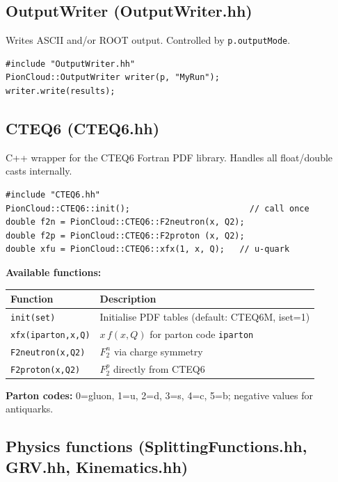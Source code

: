 \documentclass[11pt,a4paper]{article}
\newcommand{\code}[1]{\texttt{#1}}
\begin{document}
\subsection{OutputWriter (OutputWriter.hh)}

Writes ASCII and/or ROOT output.  Controlled by
\code{p.outputMode}.

\begin{lstlisting}[style=cppstyle]
#include "OutputWriter.hh"
PionCloud::OutputWriter writer(p, "MyRun");
writer.write(results);
\end{lstlisting}

\subsection{CTEQ6 (CTEQ6.hh)}

C++ wrapper for the CTEQ6 Fortran PDF library.  Handles all
float/double casts internally.

\begin{lstlisting}[style=cppstyle]
#include "CTEQ6.hh"
PionCloud::CTEQ6::init();                        // call once
double f2n = PionCloud::CTEQ6::F2neutron(x, Q2);
double f2p = PionCloud::CTEQ6::F2proton (x, Q2);
double xfu = PionCloud::CTEQ6::xfx(1, x, Q);   // u-quark
\end{lstlisting}

\textbf{Available functions:}

\begin{center}
\begin{tabular}{lp{8cm}}
\toprule
\textbf{Function} & \textbf{Description} \\
\midrule
\code{init(set)}          & Initialise PDF tables (default: CTEQ6M, iset=1) \\
\code{xfx(iparton,x,Q)}  & $x\,f(x,Q)$ for parton code \code{iparton} \\
\code{F2neutron(x,Q2)}   & $F_2^n$ via charge symmetry \\
\code{F2proton(x,Q2)}    & $F_2^p$ directly from CTEQ6 \\
\bottomrule
\end{tabular}
\end{center}

\textbf{Parton codes:} 0=gluon, 1=u, 2=d, 3=s, 4=c, 5=b;
negative values for antiquarks.

\subsection{Physics functions (SplittingFunctions.hh, GRV.hh, Kinematics.hh)}
\end{document}
